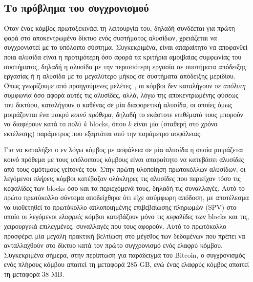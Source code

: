 \subsection*{Το πρόβλημα του συγχρονισμού}

Όταν ένας κόμβος πρωτοξεκινάει τη λειτουργία του, δηλαδή συνδέεται για πρώτη φορά στο αποκεντρωμένο
δίκτυο ενός συστήματος αλυσίδων, χρειάζεται να συγχρονιστεί με το υπόλοιπο σύστημα. Συγκεκριμένα,
είναι απαραίτητο να αποφανθεί ποια αλυσίδα είναι η προτιμότερη όσο αφορά τα κριτήρια αμοιβαίας
συμφωνίας του συστήματος, δηλαδή η αλυσίδα με την περισσότερη εργασία σε συστήματα απόδειξης εργασίας
ή η αλυσίδα με το μεγαλύτερο μήκος σε συστήματα απόδειξης μεριδίου. Όπως γνωρίζουμε από προηγούμενες
μελέτες~\cite{backbone}, οι κόμβοι δεν καταλήγουν σε \emph{απόλυτη} συμφωνία όσο αφορά αυτές τις αλυσίδες,
αλλά, λόγω της αποκεντρωμένης φύσεως του δικτύου, καταλήγουν ο καθένας σε μία διαφορετική αλυσίδα,
οι οποίες όμως μοιράζονται ένα μακρύ \emph{κοινό πρόθεμα}, δηλαδή το εκάστοτε επιθέματά τους μπορούν
να διαφέρουν κατά το πολύ $k$ blocks, όπου $k$ είναι μία (σταθερή στο χρόνο εκτέλεσης) παράμετρος που
εξαρτάται από την παράμετρο ασφάλειας.

Για να καταλήξει ο εν λόγω κόμβος με ασφάλεια σε μία αλυσίδα η οποία μοιράζεται κοινό πρόθεμα με τους
υπόλοιπους κόμβους είναι απαραίτητο να κατεβάσει αλυσίδες από τους ομότιμους γείτονές του. Στην
πρώτη υλοποίηση πρωτοκόλλων αλυσίδων, οι λεγόμενοι \emph{πλήρεις} κόμβοι κατέβαζαν ολόκληρες τις
αλυσίδες που περιείχαν τόσο
τις κεφαλίδες των blocks όσο και τα περιεχόμενά τους, δηλαδή τις συναλλαγές. Αυτό το πρώτο πρωτόκολλο
σύντομα αποδείχθηκε ότι είχε ασύμφωρη απόδοση, με αποτέλεσμα να υιοθετηθεί το πρωτόκολλο απλοποιημένης
επιβεβαίωσης πληρωμών (SPV) στο οποίο οι λεγόμενοι \emph{ελαφρείς} κόμβοι κατεβάζουν μόνο τις \emph{κεφαλίδες}
των blocks και τις, χειρουργικά επιλεγμένες, συναλλαγές που τους αφορούν. Αυτό το πρωτόκολλο προσφέρει
μία μεγάλη πρακτική βελτίωση στο μέγεθος των δεδομένων που πρέπει να ανταλλαχθούν στο δίκτυο κατά τον
πρώτο συγχρονισμό ενός ελαφρύ κόμβου. Συγκεκριμένα σήμερα, στην περίπτωση για παράδειγμα του Bitcoin, ο
συγχρονισμός ενός πλήρους κόμβου απαιτεί τη μεταφορά $285$ GB, ενώ ένας ελαφρύς κόμβος
απαιτεί τη μεταφορά $38$ MB.

